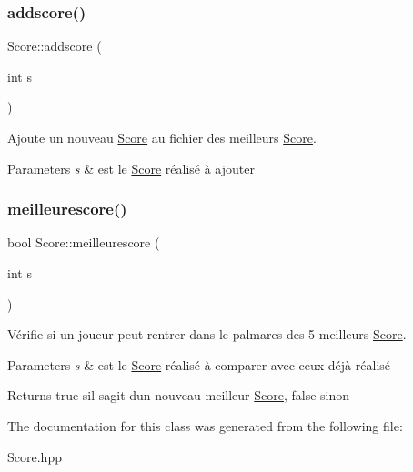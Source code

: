\subsubsection{\texorpdfstring{addscore()}{addscore()}}
{\footnotesize\ttfamily Score\+::addscore (\begin{DoxyParamCaption}\item[{int}]{s }\end{DoxyParamCaption})}



Ajoute un nouveau \hyperlink{classScore}{Score} au fichier des meilleurs \hyperlink{classScore}{Score}. 


\begin{DoxyParams}{Parameters}
{\em s} & est le \hyperlink{classScore}{Score} réalisé à ajouter \\
\hline
\end{DoxyParams}
\mbox{\label{classScore_aed385c5969860d59ca1477e2699c2f54}} 
\subsubsection{\texorpdfstring{meilleurescore()}{meilleurescore()}}
{\footnotesize\ttfamily bool Score\+::meilleurescore (\begin{DoxyParamCaption}\item[{int}]{s }\end{DoxyParamCaption})}



Vérifie si un joueur peut rentrer dans le palmares des 5 meilleurs \hyperlink{classScore}{Score}. 


\begin{DoxyParams}{Parameters}
{\em s} & est le \hyperlink{classScore}{Score} réalisé à comparer avec ceux déjà réalisé \\
\hline
\end{DoxyParams}
\begin{DoxyReturn}{Returns}
true s\textquotesingle{}il s\textquotesingle{}agit d\textquotesingle{}un nouveau meilleur \hyperlink{classScore}{Score}, false sinon 
\end{DoxyReturn}


The documentation for this class was generated from the following file\+:\begin{DoxyCompactItemize}
\item 
Score.\+hpp\end{DoxyCompactItemize}
